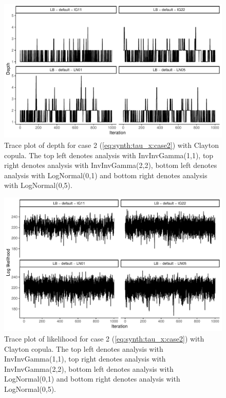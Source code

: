 \documentclass{amsart}
\begin{document}
\begin{figure}
	\centering
	\includegraphics[width = 0.75\linewidth]{trace_case2_clayton_depth.pdf}
	\caption{Trace plot of depth for case 2 (\cref{eq:synth:tau_x:case2}) with Clayton copula. The top left denotes analysis with InvInvGamma(1,1), top right denotes analysis with InvInvGamma(2,2), bottom left denotes analysis with LogNormal(0,1) and bottom right denotes analysis with LogNormal(0,5).}
	\label{fig:case2:clayton:depth}
\end{figure}

\begin{figure}
	\centering
	\includegraphics[width = 0.75\linewidth]{trace_case2_clayton_like.pdf}
	\caption{Trace plot of likelihood for case 2 (\cref{eq:synth:tau_x:case2}) with Clayton copula. The top left denotes analysis with InvInvGamma(1,1), top right denotes analysis with InvInvGamma(2,2), bottom left denotes analysis with LogNormal(0,1) and bottom right denotes analysis with LogNormal(0,5).}
	\label{fig:case2:clayton:like}
\end{figure}
\end{document}
